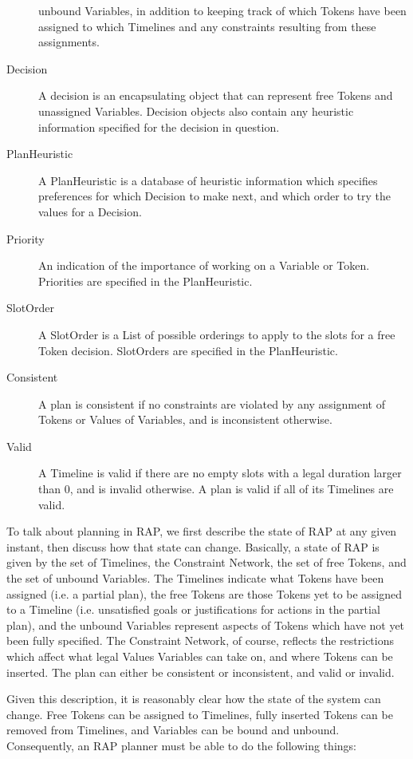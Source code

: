 \begin{description}
    unbound Variables, in addition to keeping track of which Tokens have been
    assigned to which Timelines and any constraints resulting from these
    assignments. 
    \item[Decision] A decision is an encapsulating object that 
    can represent free Tokens and unassigned Variables.  Decision 
    objects also contain any heuristic information specified for the 
    decision in question.
    \item[PlanHeuristic] A PlanHeuristic is a database of heuristic information
    which specifies preferences for which Decision to make next, and which
    order to try the values for a Decision.
    \item[Priority] An indication of the importance of working on a Variable
    or Token.  Priorities are specified in the PlanHeuristic.
    \item[SlotOrder] A SlotOrder is a List of possible orderings to apply to the
    slots for a free Token decision.  SlotOrders are specified in the PlanHeuristic.
    \item[Consistent]  A plan is consistent if no constraints are violated by
    any assignment of Tokens or Values of Variables, and is inconsistent otherwise.
    \item[Valid] A Timeline is valid if there are no empty slots with a legal duration
    larger than 0, and is invalid otherwise.  A plan is valid if all of its Timelines
    are valid.
\end{description}

To talk about planning in RAP, we first describe the state of RAP at
any given instant, then discuss how that state can change.  Basically,
a state of RAP is given by the set of Timelines, the Constraint
Network, the set of free Tokens, and the set of unbound Variables.
The Timelines indicate what Tokens have been assigned (i.e. a partial
plan), the free Tokens are those Tokens yet to be assigned to a
Timeline (i.e.  unsatisfied goals or justifications for actions in the
partial plan), and the unbound Variables represent aspects of Tokens
which have not yet been fully specified.  The Constraint Network, of
course, reflects the restrictions which affect what legal Values
Variables can take on, and where Tokens can be inserted.  The plan can
either be consistent or inconsistent, and valid or invalid.

Given this description, it is reasonably clear how the state of the
system can change.  Free Tokens can be assigned to Timelines, fully
inserted Tokens can be removed from Timelines, and Variables can be
bound and unbound.  Consequently, an RAP planner must be able to do
the following things:

